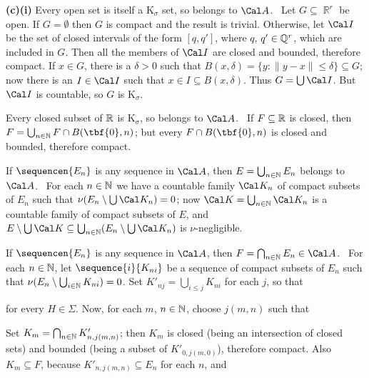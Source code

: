 {

\medskip

{\bf (c)(i)} Every open set is itself a K$_{\sigma}$ set, so belongs to
$\Cal A$.
\Prf\ Let $G\subseteq\BbbR^r$ be open.   If $G=\emptyset$ then $G$ is
compact and the result is trivial.   Otherwise, let $\Cal I$ be the set
of closed intervals of the form $[q,q']$, where $q$, $q'\in\Bbb Q^r$,
which are included in $G$.   Then all the members of $\Cal I$ are closed
and bounded, therefore compact.   If $x\in G$, there is a $\delta>0$
such that $B(x,\delta)=\{y:\|y-x\|\le\delta\}\subseteq G$;  now there is
an $I\in\Cal I$ such that $x\in I\subseteq B(x,\delta)$.   Thus
$G=\bigcup\Cal I$.   But $\Cal I$ is countable, so $G$ is K$_{\sigma}$.\
\Qed

\medskip

 Every closed subset of $\Bbb R$ is K$_{\sigma}$, so
belongs to $\Cal A$.
\Prf\ If $F\subseteq\Bbb R$ is closed, then
$F=\bigcup_{n\in\Bbb N}F\cap B(\tbf{0},n)$;  but every $F\cap
B(\tbf{0},n)$ is closed and bounded, therefore compact.\ \Qed

\medskip

 If $\sequencen{E_n}$ is any sequence in $\Cal A$, then
$E=\bigcup_{n\in\Bbb N}E_n$ belongs to
$\Cal A$.   \Prf\ For each $n\in\Bbb N$ we have a countable family
$\Cal K_n$ of compact subsets of $E_n$ such that $\nu(E_n\setminus\bigcup\Cal K_n)=0$;  now
$\Cal K=\bigcup_{n\in\Bbb N}\Cal K_n$ is a countable
family of compact subsets of $E$, and
$E\setminus\bigcup\Cal K
\subseteq\bigcup_{n\in\Bbb N}(E_n\setminus\bigcup\Cal K_n)$ is
$\nu$-negligible.\ \Qed

\medskip

 If $\sequencen{E_n}$ is any sequence in $\Cal A$, then
$F=\bigcap_{n\in\Bbb N}E_n\in\Cal A$.   \Prf\ For each $n\in\Bbb N$, let
$\sequence{i}{K_{ni}}$ be a sequence of compact subsets of $E_n$ such
that $\nu(E_n\setminus\bigcup_{i\in\Bbb N}K_{ni})=0$.   Set
$K'_{nj}=\bigcup_{i\le j}K_{ni}$ for each $j$, so that


\noindent for every $H\in\Sigma$.   Now, for each $m$, $n\in\Bbb N$,
choose $j(m,n)$ such that


\noindent Set $K_m=\bigcap_{n\in\Bbb N}K'_{n,j(m,n)}$;  then $K_m$ is
closed (being an intersection of closed sets) and bounded (being a
subset of $K'_{0,j(m,0)}$), therefore compact.   Also $K_m\subseteq F$,
because $K'_{n,j(m,n)}\subseteq E_n$ for each $n$, and

}
